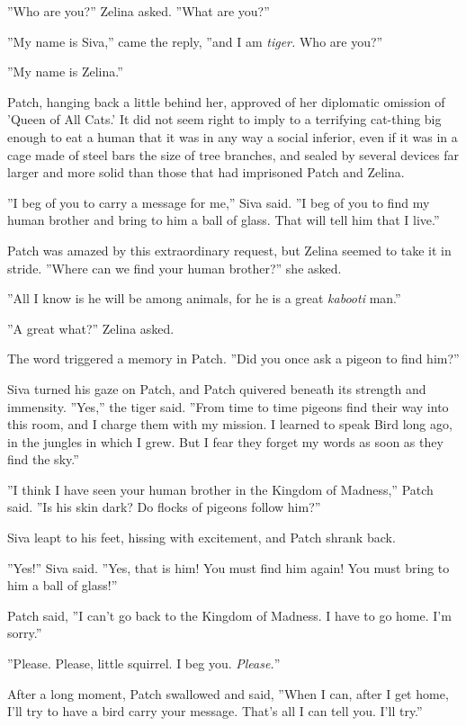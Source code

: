 \documentclass[12pt]{book}
\begin{document}
''Who are you?'' Zelina asked. ''What are you?''

''My name is Siva,'' came the reply, ''and I am \textit{tiger.} Who
are you?''

''My name is Zelina.''

Patch, hanging back a little behind her, approved of her diplomatic
omission of 'Queen of All Cats.' It did not seem right to imply to a
terrifying cat-thing big enough to eat a human that it was in any way
a social inferior, even if it was in a cage made of steel bars the
size of tree branches, and sealed by several devices far larger and
more solid than those that had imprisoned Patch and Zelina.

''I beg of you to carry a message for me,'' Siva said. ''I beg of you
to find my human brother and bring to him a ball of glass. That will
tell him that I live.''

Patch was amazed by this extraordinary request, but Zelina seemed to
take it in stride. ''Where can we find your human brother?'' she
asked.

''All I know is he will be among animals, for he is a great
\textit{kabooti} man.''

''A great what?'' Zelina asked.

The word triggered a memory in Patch. ''Did you once ask a pigeon to
find him?''

Siva turned his gaze on Patch, and Patch quivered beneath its strength
and immensity. ''Yes,'' the tiger said. ''From time to time pigeons
find their way into this room, and I charge them with my mission. I
learned to speak Bird long ago, in the jungles in which I grew. But I
fear they forget my words as soon as they find the sky.''

''I think I have seen your human brother in the Kingdom of Madness,''
Patch said. ''Is his skin dark? Do flocks of pigeons follow him?''

Siva leapt to his feet, hissing with excitement, and Patch shrank
back.

''Yes!'' Siva said. ''Yes, that is him! You must find him again! You
must bring to him a ball of glass!''

Patch said, ''I can't go back to the Kingdom of Madness. I have to go
home. I'm sorry.''

''Please. Please, little squirrel. I beg you. \textit{Please.}''

After a long moment, Patch swallowed and said, ''When I can, after I
get home, I'll try to have a bird carry your message. That's all I can
tell you. I'll try.''
\end{document}
